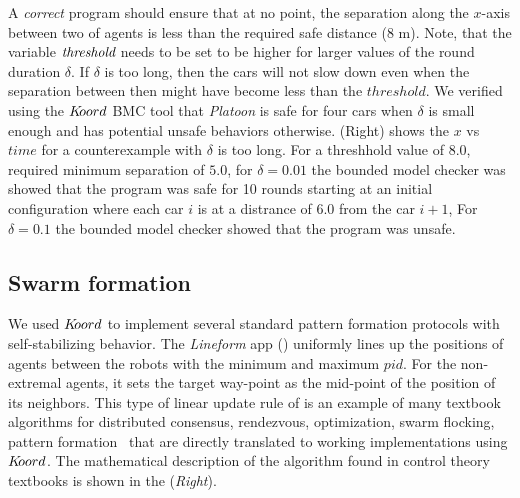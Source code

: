 A \emph{correct} program should ensure that at no point, the separation along the $x$-axis between two of agents is less than the required safe distance ($8$ m).  Note, that the variable $\emph{threshold}$ needs to be set to be higher for larger values of the round duration $\delta$. If $\delta$ is too long, then the cars will not slow down even when the separation between then might have become less than the $\mathit{threshold}$. We verified using the $K\kern-2pt oord$ BMC tool that \emph{Platoon} is safe for four cars when $\delta$ is small enough and has potential unsafe behaviors otherwise. (Right) shows the $x$ vs $\mathit{time}$ for a counterexample with  $\delta$ is too long. For a threshhold value of $8.0$, required minimum separation of $5.0$, for $\delta = 0.01$ the bounded model checker was showed that the program was safe for 10 rounds starting at an initial configuration where each car $i$ is at a distrance of 6.0 from the car $\mathit{i}+1$, For $\delta = 0.1$ the bounded model checker showed that the program was unsafe. 
 

\subsection{Swarm formation}
\label{sec:formation}
We used $K\kern-2pt oord$ to implement several standard pattern formation protocols with  self-stabilizing behavior. The \emph{Lineform} app () uniformly lines up the positions of  agents between the robots with the minimum and maximum $pid$. For the non-extremal agents, it sets the target way-point as the mid-point of the position of its neighbors. This type of linear update rule of is an example of many  textbook algorithms for distributed consensus,  rendezvous, optimization, swarm flocking, pattern formation~\cite{Tsitsiklis:1986,Blondel,Magnusbook2010} that are directly translated to working implementations using $K\kern-2pt oord$. The mathematical description of the algorithm found in control theory textbooks is shown in the  (\emph{Right}). 

